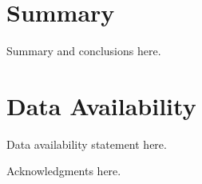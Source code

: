 \documentclass[onecolumn]{openjournal}
\newcommand{\software}[1]{\par\vspace{2mm}\noindent\textit{Software:} #1\par}
\newcommand{\facilities}[1]{\par\vspace{2mm}\noindent\textit{Facilities:} #1\par}
\begin{document}
\section{Summary}
\label{sec:summary}
Summary and conclusions here.

\section*{Data Availability}
Data availability statement here.

\acknowledgments
Acknowledgments here.


\clearpage



\end{document}
